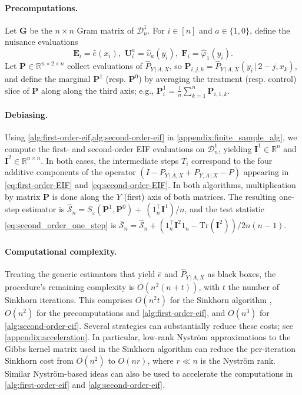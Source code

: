 \documentclass{article}
\theoremstyle{plain}
\theoremstyle{definition}
\theoremstyle{remark}
\newcommand{\of}[1]{\left(#1\right)}
\newcommand{\cD}{\mathcal{D}}
\newcommand{\bE}{\mathbf{E}}
\newcommand{\bU}{\mathbf{U}}
\newcommand{\bI}{\mathbf{I}}
\newcommand{\bF}{\mathbf{F}}
\newcommand{\bG}{\mathbf{G}}
\newcommand{\bP}{\mathbf{P}}
\newcommand{\wh}[1]{\widehat{#1}}
\newcommand{\hP}{\widehat{P}}
\newcommand{\1}{\mathbbm{1}}
\newcommand{\STE}{\mathscr{S}}
\newcommand{\eps}{\varepsilon}
\theoremstyle{plain}
\theoremstyle{definition}
\newcommand{\mymid}{\,|\,}
\begin{document}
\paragraph{Precomputations.}
Let $\bG$ be the $n \times n$ Gram matrix of $\cD_n^1$. For $i\in [n]$ and $a \in \{1,0\}$, define the nuisance evaluations
\[
\bE_i = \hat{e}(x_i), \,\,
\bU^a_i = \hat\upsilon_a(y_i), \,\, \bF_i = \hat\varphi_1(y_i).
\]
Let $\bP \in \mathbb R^{n\times 2\times n}$ collect evaluations of $\hP_{Y \mymid A, X}$, so $\bP_{i,j,k} = \hP_{Y \mymid A, X}(y_i \mymid 2-j, x_k)$, and define the marginal
$\bP^1 $ (resp. $\bP^0$) by averaging the treatment (resp. control) slice of $\bP$ along  along the third axis; e.g., $\bP^1_i = \frac{1}{n} \sum_{k=1}^n \bP_{i,1,k}$.


\paragraph{Debiasing.} Using \cref{alg:first-order-eif,alg:second-order-eif} in \cref{appendix:finite_sample_alg}, we compute the first- and second-order EIF evaluations on $\cD_n^1$, yielding $\bI^1 \in \mathbb R^n$ and $\bI^2 \in \mathbb R^{n\times n}$. In both cases, the intermediate steps $T_i$ correspond to the four additive components of the operator $(I - P_{Y\mymid A,X} + P_{Y,A\mymid X} - P)$ appearing in \eqref{eq:first-order-EIF} and \eqref{eq:second-order-EIF}. In both algorithms, multiplication by matrix $\bP$ is done along the $Y$ (first) axis of both matrices. The resulting one-step estimator is $\wh{\STE}_n = S_\eps(\bP^1, \bP^0) + \ (1_n^\top \bI^1)/n$, and the test statistic \eqref{eq:second_order_one_step} is 
$\overline{\STE}_n = \wh{\STE}_n +  \of{1_n^\top \bI^2 1_n - \text{Tr}(\bI^2)} / 2 n (n-1).$

\paragraph{Computational complexity.} Treating the generic estimators that yield $\hat{e}$ and $\widehat{P}_{Y\mymid A,X}$ as black boxes, the procedure's remaining complexity is $O(n^2(n+t))$, with $t$ the number of Sinkhorn iterations. This comprises $O(n^2t)$ for the Sinkhorn algorithm \citep{dvurechensky2018computational}, $O(n^2)$ for the precomputations and \cref{alg:first-order-eif}, and $O(n^3)$ for \cref{alg:second-order-eif}. Several strategies can substantially reduce these costs; see \cref{appendix:acceleration}. In particular, low-rank Nyström approximations to the Gibbs kernel matrix used in the Sinkhorn algorithm can reduce the per-iteration Sinkhorn cost from $O(n^2)$ to $O(nr)$, where $r\ll n$ is the Nyström rank. Similar Nyström-based ideas can also be used to accelerate the computations in \cref{alg:first-order-eif} and \cref{alg:second-order-eif}. 
\end{document}
